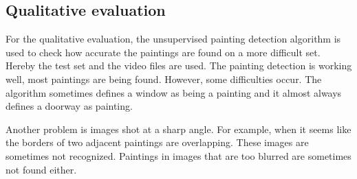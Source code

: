 \subsection{Qualitative evaluation}
For the qualitative evaluation, the unsupervised painting detection algorithm is used to check how accurate the paintings are found on a more difficult set. Hereby the test set and the video files are used. The painting detection is working well, most paintings are being found. However, some difficulties occur. The algorithm sometimes defines a window as being a painting and it almost always defines a doorway as painting.

Another problem is images shot at a sharp angle. For example, when it seems like the borders of two adjacent paintings are overlapping. These images are sometimes not recognized. Paintings in images that are too blurred are sometimes not found either.
